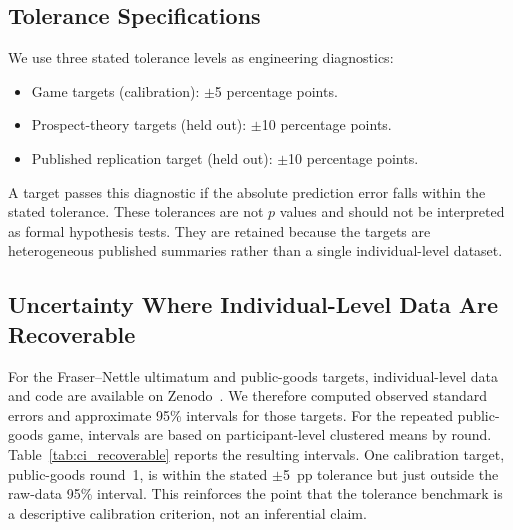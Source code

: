 \documentclass[journal]{IEEEtran}
\begin{document}
\subsection{Tolerance Specifications}

We use three stated tolerance levels as engineering diagnostics:
\begin{itemize}
    \item Game targets (calibration): $\pm$5 percentage points.
    \item Prospect-theory targets (held out): $\pm$10 percentage points.
    \item Published replication target (held out): $\pm$10 percentage points.
\end{itemize}
A target passes this diagnostic if the absolute prediction error falls within the stated tolerance.
These tolerances are not $p$ values and should not be interpreted as formal hypothesis tests.
They are retained because the targets are heterogeneous published summaries rather than a single individual-level dataset.

\subsection{Uncertainty Where Individual-Level Data Are Recoverable}

For the Fraser--Nettle ultimatum and public-goods targets, individual-level data and code are available on Zenodo~\cite{fraserdata2020}.
We therefore computed observed standard errors and approximate 95\% intervals for those targets.
For the repeated public-goods game, intervals are based on participant-level clustered means by round.
Table~\ref{tab:ci_recoverable} reports the resulting intervals.
One calibration target, public-goods round~1, is within the stated $\pm$5~pp tolerance but just outside the raw-data 95\% interval.
This reinforces the point that the tolerance benchmark is a descriptive calibration criterion, not an inferential claim.
\end{document}
